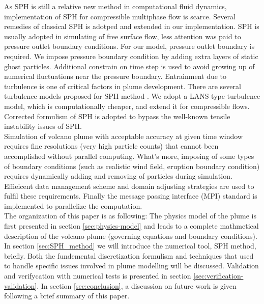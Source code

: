 \documentclass[10pt,a4paper]{article}
\begin{document}
As SPH is still a relative new method in computational fluid dynamics,  implementation of SPH for compressible multiphase flow is scarce. Several remedies of classical SPH is adotped and extended in our implementation. SPH is usually adopted in simulating of free surface flow, less attention was paid to pressure outlet boundary conditions. For our model, pressure outlet boundary is required. We impose pressure boundary condition by adding extra layers of static ghost particles. Additional constrain on time step is used to avoid growing up of numerical fluctuations near the pressure boundary. Entrainment due to turbulence is one of critical factors in plume development. There are several turbulence models proposed for SPH method \cite{violeau2007numerical,issa2005numerical}. We adopt a LANS type turbulence model\cite{monaghan2011turbulence}, which is computationally cheaper, and extend it for compressible flows. Corrected formulism of SPH is adopted to bypass the well-known tensile instability issues of SPH.\\
Simulation of volcano plume with acceptable accuracy at given time window requires fine resolutions (very high particle counts) that cannot been accomplished without parallel computing. What's more, imposing of some types of boundary conditions (such as realistic wind field, eruption boundary condition) requires dynamically adding and removing of particles during simulation. Effieicent data management scheme and domain adjusting strategies are used to fulfil these requirements. Finally the message passing interface (MPI) standard is implemented to parallelize the computation.\\
The organization of this paper is as following:
The physics model of the plume is first presented in section \ref{sec:physics-model} and leads to a complete mathmetical description of the volcano plume (governing equations and boundary conditions). In section \ref{sec:SPH_method} we will introduce the numerical tool, SPH method, briefly. Both the fundemental discretization formulism and techniques that used to handle specific issues involved in plume modelling will be discussed. Validation and verifycation with numerical tests is presented in section \ref{sec:verification-validation}. In section \ref{sec:conclusion}, a discussion on future work is given following a brief summary of this paper. 
\end{document}
